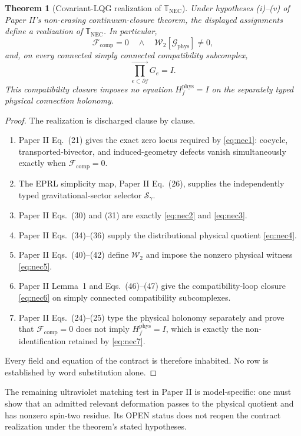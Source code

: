 \documentclass[11pt]{article}
\newtheorem{theorem}{Theorem}[section]
\newcommand{\NEC}{\mathbb T_{\mathrm{NEC}}}
\begin{document}
\begin{theorem}[Covariant-LQG realization of $\NEC$]
Under hypotheses (i)--(v) of Paper II's non-erasing continuum-closure theorem, the displayed assignments define a realization of $\NEC$. In particular,
\[
\boxed{
\mathcal F_{\mathrm{comp}}=0
\quad\land\quad
\mathcal W_2[\mathcal G_{\mathrm{phys}}]\neq0,
}
\]
and, on every connected simply connected compatibility subcomplex,
\[
\boxed{
\overrightarrow{\prod_{e\subset\partial f}}G_e=I.
}
\]
This compatibility closure imposes no equation $H_f^{\mathrm{phys}}=I$ on the separately typed physical connection holonomy.
\end{theorem}
\begin{proof}
The realization is discharged clause by clause.
\begin{enumerate}[label=(\arabic*)]
\item Paper II Eq.~(21) gives the exact zero locus required by \eqref{eq:nec1}: cocycle, transported-bivector, and induced-geometry defects vanish simultaneously exactly when $\mathcal F_{\mathrm{comp}}=0$.
\item The EPRL simplicity map, Paper II Eq.~(26), supplies the independently typed gravitational-sector selector $\mathcal S_\gamma$.
\item Paper II Eqs.~(30) and (31) are exactly \eqref{eq:nec2} and \eqref{eq:nec3}.
\item Paper II Eqs.~(34)--(36) supply the distributional physical quotient \eqref{eq:nec4}.
\item Paper II Eqs.~(40)--(42) define $\mathcal W_2$ and impose the nonzero physical witness \eqref{eq:nec5}.
\item Paper II Lemma~1 and Eqs.~(46)--(47) give the compatibility-loop closure \eqref{eq:nec6} on simply connected compatibility subcomplexes.
\item Paper II Eqs.~(24)--(25) type the physical holonomy separately and prove that $\mathcal F_{\mathrm{comp}}=0$ does not imply $H_f^{\mathrm{phys}}=I$, which is exactly the non-identification retained by \eqref{eq:nec7}.
\end{enumerate}
Every field and equation of the contract is therefore inhabited. No row is established by word substitution alone.
\end{proof}

The remaining ultraviolet matching test in Paper II is model-specific: one must show that an admitted relevant deformation passes to the physical quotient and has nonzero spin-two residue. Its OPEN status does not reopen the contract realization under the theorem's stated hypotheses.
\end{document}
